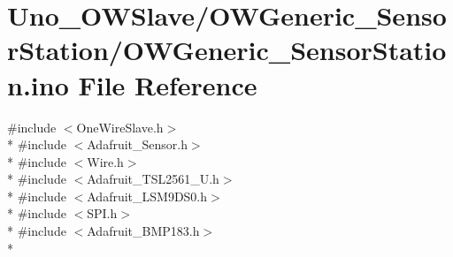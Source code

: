 \hypertarget{OWGeneric__SensorStation_8ino}{\section{Uno\-\_\-\-O\-W\-Slave/\-O\-W\-Generic\-\_\-\-Sensor\-Station/\-O\-W\-Generic\-\_\-\-Sensor\-Station.ino File Reference}
\label{OWGeneric__SensorStation_8ino}
}
{\ttfamily \#include $<$One\-Wire\-Slave.\-h$>$}\\*
{\ttfamily \#include $<$Adafruit\-\_\-\-Sensor.\-h$>$}\\*
{\ttfamily \#include $<$Wire.\-h$>$}\\*
{\ttfamily \#include $<$Adafruit\-\_\-\-T\-S\-L2561\-\_\-\-U.\-h$>$}\\*
{\ttfamily \#include $<$Adafruit\-\_\-\-L\-S\-M9\-D\-S0.\-h$>$}\\*
{\ttfamily \#include $<$S\-P\-I.\-h$>$}\\*
{\ttfamily \#include $<$Adafruit\-\_\-\-B\-M\-P183.\-h$>$}\\*
